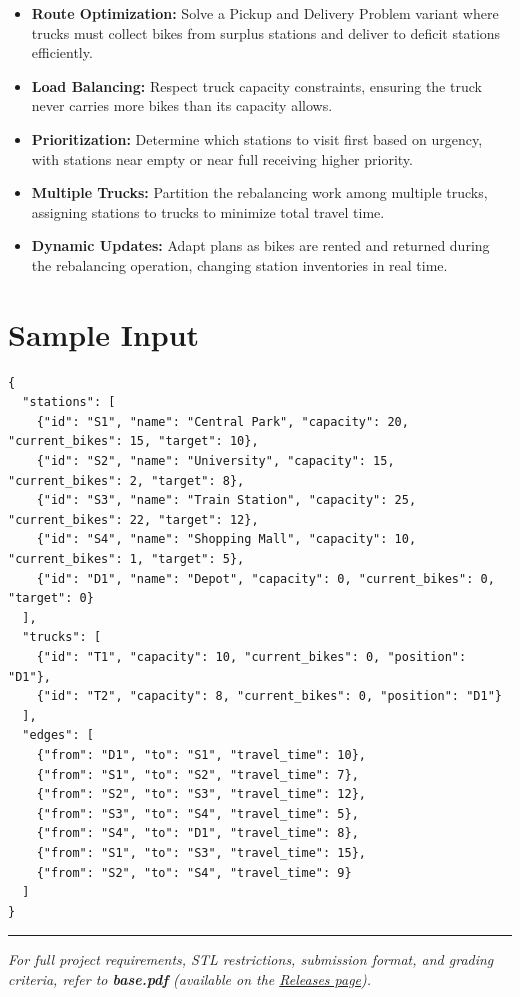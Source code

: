 \begin{itemize}
  \item \textbf{Route Optimization:} Solve a Pickup and Delivery Problem variant where trucks must collect bikes from surplus stations and deliver to deficit stations efficiently.
  \item \textbf{Load Balancing:} Respect truck capacity constraints, ensuring the truck never carries more bikes than its capacity allows.
  \item \textbf{Prioritization:} Determine which stations to visit first based on urgency, with stations near empty or near full receiving higher priority.
  \item \textbf{Multiple Trucks:} Partition the rebalancing work among multiple trucks, assigning stations to trucks to minimize total travel time.
  \item \textbf{Dynamic Updates:} Adapt plans as bikes are rented and returned during the rebalancing operation, changing station inventories in real time.
\end{itemize}

\section{Sample Input}

\begin{lstlisting}[style=json, caption={data/input\_sample.json}]
{
  "stations": [
    {"id": "S1", "name": "Central Park", "capacity": 20, "current_bikes": 15, "target": 10},
    {"id": "S2", "name": "University", "capacity": 15, "current_bikes": 2, "target": 8},
    {"id": "S3", "name": "Train Station", "capacity": 25, "current_bikes": 22, "target": 12},
    {"id": "S4", "name": "Shopping Mall", "capacity": 10, "current_bikes": 1, "target": 5},
    {"id": "D1", "name": "Depot", "capacity": 0, "current_bikes": 0, "target": 0}
  ],
  "trucks": [
    {"id": "T1", "capacity": 10, "current_bikes": 0, "position": "D1"},
    {"id": "T2", "capacity": 8, "current_bikes": 0, "position": "D1"}
  ],
  "edges": [
    {"from": "D1", "to": "S1", "travel_time": 10},
    {"from": "S1", "to": "S2", "travel_time": 7},
    {"from": "S2", "to": "S3", "travel_time": 12},
    {"from": "S3", "to": "S4", "travel_time": 5},
    {"from": "S4", "to": "D1", "travel_time": 8},
    {"from": "S1", "to": "S3", "travel_time": 15},
    {"from": "S2", "to": "S4", "travel_time": 9}
  ]
}
\end{lstlisting}

\vfill
\noindent\rule{\textwidth}{0.4pt}
{\small\textit{For full project requirements, STL restrictions, submission format, and grading criteria, refer to \textbf{base.pdf} (available on the \href{https://github.com/BestSithInEU/cse211-term-projects/releases}{Releases page}).}}
